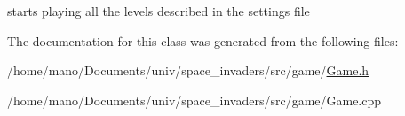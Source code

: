 starts playing all the levels described in the settings file 

The documentation for this class was generated from the following files\+:\begin{DoxyCompactItemize}
\item 
/home/mano/\+Documents/univ/space\+\_\+invaders/src/game/\hyperlink{Game_8h}{Game.\+h}\item 
/home/mano/\+Documents/univ/space\+\_\+invaders/src/game/Game.\+cpp\end{DoxyCompactItemize}
